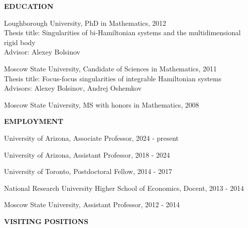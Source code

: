 \documentclass[a4paper, 12pt]{article}
\begin{document}
\par
\quad\par\bigskip
\textbf{{EDUCATION}}\par\smallskip
\begin{compactitem}
\item Loughborough University, PhD in Mathematics, 2012 \\
 Thesis title: {Singularities of bi-Hamiltonian systems and the multidimensional rigid body} \\  Advisor: Alexey Bolsinov 
\item   Moscow State University,  Candidate of Sciences in Mathematics,  2011 \\ 
Thesis title: {{Focus-focus singularities of integrable Hamiltonian systems}} \\
  Advisors: Alexey Bolsinov, Andrej Oshemkov
\item  Moscow State University, MS with honors in Mathematics, 2008
\end{compactitem}
\par\quad\par\smallskip
\textbf{EMPLOYMENT}\par\smallskip
\begin{compactitem}
\item University of Arizona, Associate Professor, 2024 - present
\item University of Arizona, Assistant Professor, 2018 - 2024
\item University of Toronto, Postdoctoral Fellow, 2014 - 2017 \
\item   National Research University Higher School of Economics, Docent, 2013 - 2014 

\item Moscow State University, Assistant Professor,  2012 - 2014\
 \end{compactitem}
 \par\quad\par\smallskip
\textbf{VISITING POSITIONS}\par\smallskip
\end{document}
